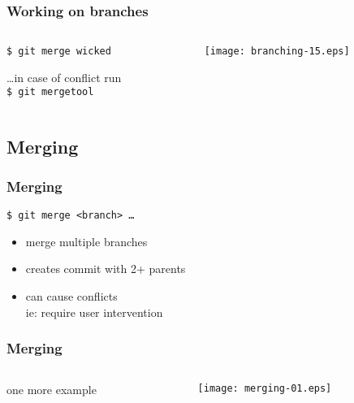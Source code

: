 \documentclass[english]{beamer}
\newcommand{\mysubsection}[2]{%
  \hypertarget{#2}{}%
  \subsection{#1}%
  \label{#2}%
}
\newcommand{\CMD}[1]{%
\texttt{\textcolor{code-blue}{#1}}%
}
\newcommand{\faint}[1]{%
\textcolor{code-gray}{#1}%
}
\newcommand{\red}[1]{%
\textcolor{code-red}{#1}%
}
\begin{document}
\begin{frame}
\frametitle{Working on branches}

\begin{columns}[t]
        \begin{column}[T]{.5\textwidth}
                {\small
                \CMD{\$ git merge wicked} \\

                \pause{}
                \vspace{\baselineskip}

                \faint{\ldots in case of conflict run} \\

                \CMD{\$ git mergetool} \\
                }
        \end{column}
        \begin{column}[T]{.5\textwidth}
                \texttt{[image: branching-15.eps]}
        \end{column}
\end{columns}
\end{frame}

\mysubsection{Merging}{using:merging}
\begin{frame}
\frametitle{Merging}

\CMD{\$ git merge <branch> \ldots} \\
\begin{itemize}
        \item merge multiple branches
        \item creates commit with 2+ parents
        \item can cause \red{conflicts} \\
                \faint{ie: require user intervention}
\end{itemize}
\end{frame}

\begin{frame}
\frametitle{Merging}

\begin{columns}[t]
        \begin{column}[T]{.5\textwidth}
                one more example
        \end{column}
        \begin{column}[T]{.5\textwidth}
                \texttt{[image: merging-01.eps]}
        \end{column}
\end{columns}
\end{frame}
\end{document}
